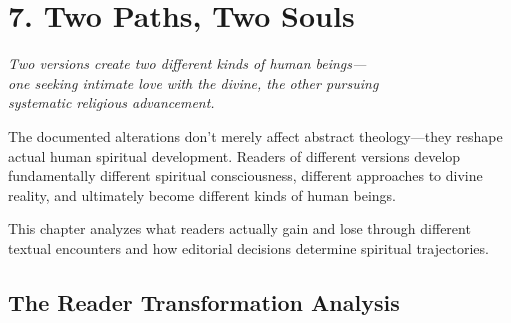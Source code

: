 \documentclass[11pt,twoside]{book}
\begin{document}
\chapter*{7. Two Paths, Two Souls}
\label{sec:org15a1633}

{\centering\itshape Two versions create two different kinds of human beings—\\one seeking intimate love with the divine, the other pursuing\\systematic religious advancement.\par}
\vspace{0.3cm}

\normalfont\justifying
The documented alterations don't merely affect abstract theology—they reshape actual human spiritual development. Readers of different versions develop fundamentally different spiritual consciousness, different approaches to divine reality, and ultimately become different kinds of human beings.

This chapter analyzes what readers actually gain and lose through different textual encounters and how editorial decisions determine spiritual trajectories.
\section*{The Reader Transformation Analysis}
\label{sec:orgf651933}
\end{document}
